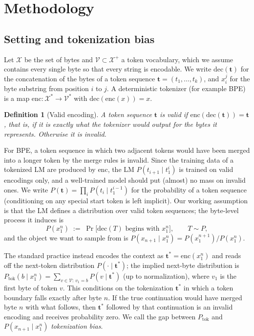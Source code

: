 \documentclass{article} %
\newtheorem{definition}{Definition}
\newcommand{\enc}{\mathrm{enc}}
\newcommand{\dec}{\mathrm{dec}}
\newcommand{\Vocab}{\mathcal{V}}
\newcommand{\Bytes}{\mathcal{X}}
\newcommand{\tseq}{\mathbf{t}}
\begin{document}
\section{Methodology}
\label{sec:method}
\subsection{Setting and tokenization bias}
\label{sec:setting}
Let $\Bytes$ be the set of bytes and $\Vocab\subset\Bytes^{+}$ a token vocabulary, which we assume contains every single byte so that every string is encodable. We write $\dec(\tseq)$ for the concatenation of the bytes of a token sequence $\tseq=(t_1,\dots,t_k)$, and $x_i^j$ for the byte substring from position $i$ to $j$. A deterministic tokenizer (for example BPE) is a map $\enc:\Bytes^{*}\to\Vocab^{*}$ with $\dec(\enc(x))=x$.

\begin{definition}[Valid encoding]\label{def:valid}
A token sequence $\tseq$ is \emph{valid} if $\enc(\dec(\tseq))=\tseq$, that is, if it is exactly what the tokenizer would output for the bytes it represents. Otherwise it is \emph{invalid}.
\end{definition}

For BPE, a token sequence in which two adjacent tokens would have been merged into a longer token by the merge rules is invalid. Since the training data of a tokenized LM are produced by $\enc$, the LM $P(t_{i+1}\mid t_1^{i})$ is trained on valid encodings only, and a well-trained model should put (almost) no mass on invalid ones. We write $P(\tseq)=\prod_{i}P(t_i\mid t_1^{i-1})$ for the probability of a token sequence (conditioning on any special start token is left implicit). Our working assumption is that the LM defines a distribution over valid token sequences; the byte-level process it induces is
\begin{equation}
P(x_1^n)\;:=\;\Pr\big[\dec(T)\text{ begins with }x_1^n\big],\qquad T\sim P,
\end{equation}
and the object we want to sample from is $P(x_{n+1}\mid x_1^n)=P(x_1^{n+1})/P(x_1^n)$.

The standard practice instead encodes the context as $\tseq^{*}=\enc(x_1^n)$ and reads off the next-token distribution $P(\cdot\mid\tseq^{*})$; the implied next-byte distribution is $P_{\mathrm{tok}}(b\mid x_1^n)=\sum_{v\in\Vocab:\,v_1=b}P(v\mid \tseq^{*})$ (up to normalization), where $v_1$ is the first byte of token $v$. This conditions on the tokenization $\tseq^*$ in which a token boundary falls exactly after byte $n$. If the true continuation would have merged byte $n$ with what follows, then $\tseq^*$ followed by that continuation is an invalid encoding and receives probability zero. We call the gap between $P_{\mathrm{tok}}$ and $P(x_{n+1}\mid x_1^n)$ \emph{tokenization bias}.
\end{document}
